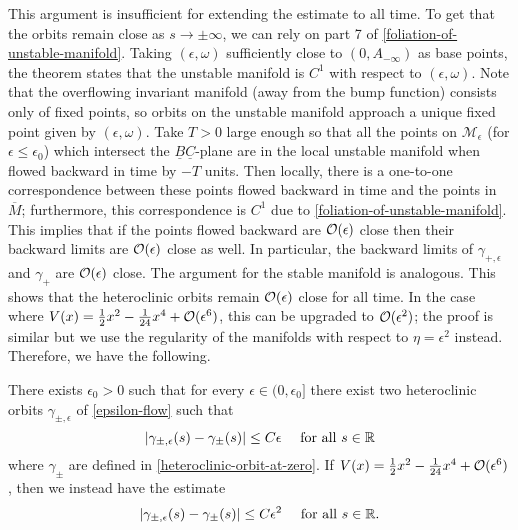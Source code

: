 This argument is insufficient for extending the estimate to all time. To get that the orbits remain close as \(s\to\pm\infty\), we can rely on part 7 of \cref{foliation-of-unstable-manifold}. Taking \((\epsilon, \omega)\) sufficiently close to \((0, A_{-\infty})\) as base points, the theorem states that the unstable manifold is \(C^1\) with respect to \((\epsilon, \omega)\). Note that the overflowing invariant manifold (away from the bump function) consists only of fixed points, so orbits on the unstable manifold approach a unique fixed point given by \((\epsilon, \omega)\). Take \(T> 0\) large enough so that all the points on \(\mathcal M_\epsilon\) (for \(\epsilon \leq \epsilon_0\)) which intersect the \(\underline B \underline C\)-plane are in the local unstable manifold when flowed backward in time by \(-T\) units. Then locally, there is a one-to-one correspondence between these points flowed backward in time and the points in \(\overline M\); furthermore, this correspondence is \(C^1\) due to \cref{foliation-of-unstable-manifold}. This implies that if the points flowed backward are \(\mathcal{O}(\epsilon)\) close then their backward limits are \(\mathcal{O}(\epsilon)\) close as well. In particular, the backward limits of \(\gamma_{+,\epsilon}\) and \(\gamma_+\) are \(\mathcal{O}(\epsilon)\) close. The argument for the stable manifold is analogous. This shows that the heteroclinic orbits remain \(\mathcal{O}(\epsilon)\) close for all time. In the case where \(V(x) = \frac 12 x^2 - \frac 1 {24} x^4 + \mathcal{O}(\epsilon^6)\), this can be upgraded to \(\mathcal{O}(\epsilon^2)\); the proof is similar but we use the regularity of the manifolds with respect to \(\eta = \epsilon^2\) instead. Therefore, we have the following.
\begin{prop}
	There exists \(\epsilon_0 > 0\) such that for every \(\epsilon\in(0,\epsilon_0]\) there exist two heteroclinic orbits \(\gamma_{\pm, \epsilon}\) of \cref{epsilon-flow} such that 
	\begin{equation}
		|\gamma_{\pm,\epsilon}(s) - \gamma_\pm(s) | \leq C \epsilon \quad \text{ for all } s\in \mathbb{R}
	\end{equation}
	where \(\gamma_{\pm}\) are defined in \cref{heteroclinic-orbit-at-zero}. If \(V(x) = \frac 12 x^2 - \frac 1 {24} x^4 + \mathcal{O}(\epsilon^6)\), then we instead have the estimate
	\begin{equation}
		|\gamma_{\pm,\epsilon}(s) - \gamma_\pm(s) | \leq C \epsilon^2 \quad \text{ for all } s\in \mathbb{R}.
	\end{equation}
\end{prop}

